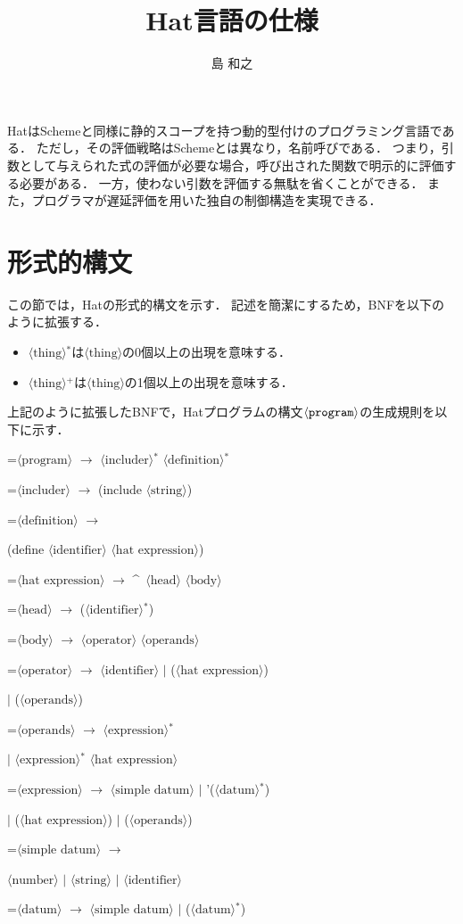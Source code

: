 \documentclass[twocolumn]{jarticle}
\def\hat{\mbox{\^{ }}}
\def\|{ $|$ \allowbreak}
\def\*{$^*$}
\def\+{$^+$}
\newcommand{\NT}[1]{\ensuremath{\langle\mbox{#1}\rangle}\allowbreak}
\newcommand{\lrto}{ \ensuremath{\rightarrow} \allowbreak}
\newenvironment{hang}[1][\parindent]
  {\def\item{\par\hangindent=#1\noindent}}
  {\par}
\begin{document}
\title{Hat言語の仕様}
\author{島 和之}
\maketitle

HatはSchemeと同様に静的スコープを持つ動的型付けのプログラミング言語である．
ただし，その評価戦略はSchemeとは異なり，名前呼びである．
つまり，引数として与えられた式の評価が必要な場合，呼び出された関数で明示的に評価する必要がある．
一方，使わない引数を評価する無駄を省くことができる．
また，プログラマが遅延評価を用いた独自の制御構造を実現できる．

\section{形式的構文}

この節では，Hatの形式的構文を示す．
記述を簡潔にするため，BNFを以下のように拡張する．
\begin{itemize}
\item\NT{thing}\*は\NT{thing}の0個以上の出現を意味する．
\item\NT{thing}\+は\NT{thing}の1個以上の出現を意味する．
\end{itemize}
上記のように拡張したBNFで，Hatプログラムの構文\NT{\tt program}の生成規則を以下に示す．
\begin{hang}\tt %
\item\NT{program}\lrto
  \NT{includer}\* \NT{definition}\*
\item\NT{includer}\lrto
  (include \NT{string})
\item\NT{definition}\lrto\par
  (define \NT{identifier} \NT{hat expression})
\item\NT{hat expression}\lrto
  \hat\ \NT{head} \NT{body}
\item\NT{head}\lrto
  (\NT{identifier}\*)
\item\NT{body}\lrto
  \NT{operator} \NT{operands}
\item\NT{operator}\lrto
  \NT{identifier}
  \| (\NT{hat expression}) \par
  \| (\NT{operands})
\item\NT{operands}\lrto
  \NT{expression}\* \par
  \| \NT{expression}\* \NT{hat expression}
\item\NT{expression}\lrto
  \NT{simple datum}
  \| '(\NT{datum}\*) \par
  \| (\NT{hat expression})
  \| (\NT{operands})
\item\NT{simple datum}\lrto \par
  \NT{number} \| \NT{string} \| \NT{identifier}
\item\NT{datum}\lrto
  \NT{simple datum}
  \| (\NT{datum}\*)
\end{hang}
\end{document}
